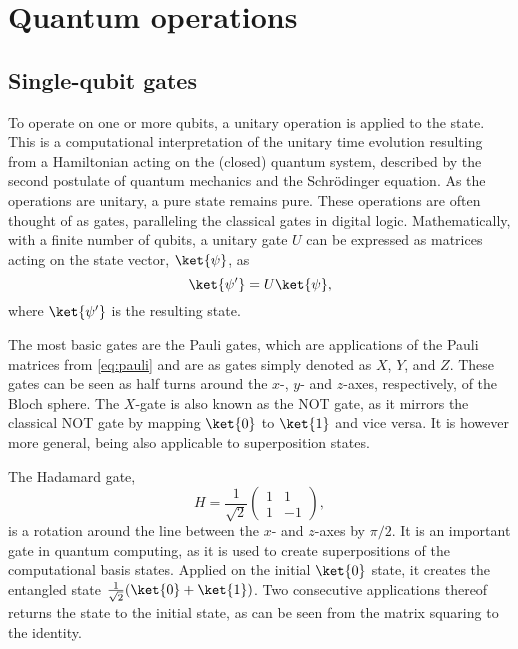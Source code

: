 \section{Quantum operations}
\label{sec:quantum_operations}
\subsection{Single-qubit gates}
To operate on one or more qubits, a unitary operation is applied to the state.
This is a computational interpretation of the unitary time evolution resulting from a Hamiltonian acting on the (closed) quantum system, described by the second postulate of quantum mechanics and the Schrödinger equation.
As the operations are unitary, a pure state remains pure.
These operations are often thought of as gates, paralleling the classical gates in digital logic.
Mathematically, with a finite number of qubits, a unitary gate $U$ can be expressed as matrices acting on the state vector, $\ket{\psi}$, as
\begin{equation}
    \ket{\psi'} = U\ket{\psi},
\end{equation}
where $\ket{\psi'}$ is the resulting state.

The most basic gates are the Pauli gates, which are applications of the Pauli matrices from \cref{eq:pauli} and are as gates simply denoted as $X$, $Y$, and $Z$.
These gates can be seen as half turns around the $x$-, $y$- and $z$-axes, respectively, of the Bloch sphere.
The $X$-gate is also known as the NOT gate, as it mirrors the classical NOT gate by mapping $\ket{0}$ to $\ket{1}$ and vice versa.
It is however more general, being also applicable to superposition states.

The Hadamard gate,
\begin{equation}
    H = \frac{1}{\sqrt{2}} \begin{pmatrix} 1 & 1 \\ 1 & -1 \end{pmatrix},
\end{equation}
is a rotation around the line between the $x$- and $z$-axes by $\pi/2$.
It is an important gate in quantum computing, as it is used to create superpositions of the computational basis states.
Applied on the initial $\ket{0}$ state, it creates the entangled state $\frac{1}{\sqrt{2}}(\ket{0} + \ket{1})$.
Two consecutive applications thereof returns the state to the initial state, as can be seen from the matrix squaring to the identity.

